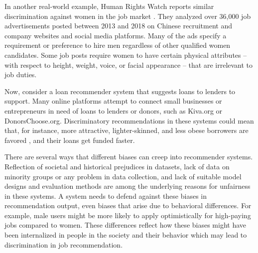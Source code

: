 In another real-world example, Human Rights Watch reports similar discrimination against women in the job market \cite{HRW2018ads}. They analyzed over 36,000 job advertisements posted between 2013 and 2018 on Chinese recruitment and company websites and social media platforms. Many of the ads specify a requirement or preference to hire men regardless of other qualified women candidates. Some job posts require women to have certain physical attributes – with respect to height, weight, voice, or facial appearance – that are irrelevant to job duties.


Now, consider a loan recommender system that suggests loans to lenders to support. Many online platforms attempt to connect small businesses or entrepreneurs in need of loans to lenders or donors, such as Kiva.org or DonorsChoose.org. Discriminatory recommendations in these systems could mean that, for instance, more attractive, lighter-skinned, and less obese borrowers are favored \cite{JENQ2015234}, and their loans get funded faster.

There are several ways that different biases can creep into recommender systems. Reflection of societal and historical prejudices in datasets, lack of data on minority groups or any problem in data collection, and lack of suitable model designs and evaluation methods are among the underlying reasons for unfairness in these systems. A system needs to defend against these biases in recommendation output, even biases that arise due to behavioral differences. For example, male users might be more likely to apply optimistically for high-paying jobs compared to women. These differences reflect how these biases might have been internalized in people in the society and their behavior which may lead to discrimination in job recommendation. 




